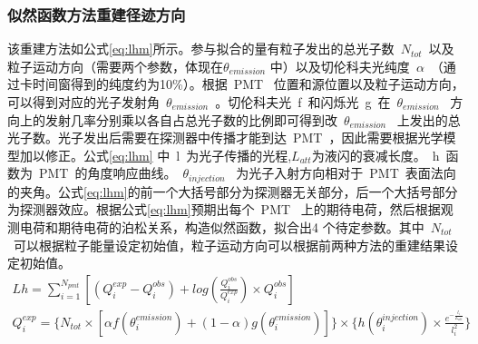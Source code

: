 \subsubsection{似然函数方法重建径迹方向}
该重建方法如公式\ref{eq:lhm}所示。参与拟合的量有粒子发出的总光子数~$N_{tot}$~以及粒子运动方向（需要两个参数，体现在$\theta_{emission}$ 中）以及切伦科夫光纯度~$\alpha$~（通过卡时间窗得到的纯度约为10\%）。根据~PMT~ 位置和源位置以及粒子运动方向，可以得到对应的光子发射角~$\theta_{emission}$~。切伦科夫光~f~和闪烁光~g~在~$\theta_{emission}$~ 方向上的发射几率分别乘以各自占总光子数的比例即可得到改~$\theta_{emission}$~ 上发出的总光子数。光子发出后需要在探测器中传播才能到达~PMT~，因此需要根据光学模型加以修正。公式\ref{eq:lhm} 中~l~为光子传播的光程,$L_{att}$为液闪的衰减长度。~h~函数为~PMT~的角度响应曲线。~$\theta_{injection}$~ 为光子入射方向相对于~PMT~表面法向的夹角。公式\ref{eq:lhm}的前一个大括号部分为探测器无关部分，后一个大括号部分为探测器效应。根据公式\ref{eq:lhm}预期出每个~PMT~ 上的期待电荷，然后根据观测电荷和期待电荷的泊松关系，构造似然函数，拟合出4 个待定参数。其中~$N_{tot}$~可以根据粒子能量设定初始值，粒子运动方向可以根据前两种方法的重建结果设定初始值。
\begin{eqnarray}\label{eq:lhm}
Lh = \sum_{i=1}^{N_{pmt}} \left [  ( Q^{exp}_i -Q^{obs}_i )+log(\frac{Q^{obs}_i}{Q^{exp}_i}) \times Q^{obs}_i \right ] \quad\quad\quad\quad\quad\quad \\
Q^{exp}_i  =
 \bigg \{ N_{tot} \times \left [ \alpha f(\theta^{emission}_i)+(1-\alpha)g(\theta^{emission}_i) \right ] \bigg \}
\times \bigg \{ h(\theta_i^{injection}) \times \frac{e^{-\frac{l_i}{L_{att}}}}{l^2_i} \bigg \} \nonumber
\end{eqnarray}
